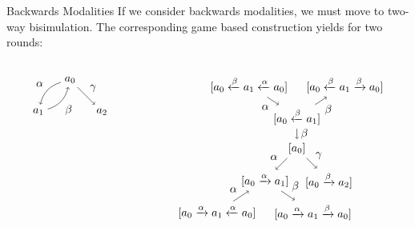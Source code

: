 \documentclass{beamer}
\begin{document}
\begin{frame}{Backwards Modalities}
    If we consider backwards modalities, we must move to two-way bisimulation. The corresponding game based construction yields for two rounds:
    \begin{columns}
    \begin{column}{0.3\textwidth}
    \begin{equation*}
    \begin{tikzpicture}
        \path node(a0) {$a_0$} +(-1,-1) node (a1) {$a_1$} +(1,-1) node(a2) {$a_2$};
        \path[->] 
        (a0) edge[bend right] node[midway, above left]{$\alpha$} (a1)
        (a1) edge[bend right] node[midway, below right]{$\beta$} (a0)
        (a0) edge node[midway, above right]{$\gamma$} (a2);
        \end{tikzpicture}
    \end{equation*}   
    \end{column}
    \begin{column}{0.7\textwidth}
    \begin{equation*}
    \begin{tikzpicture}
    \path 
    node (a) {$[a_0]$} +(-1,-1)
    node (b) {$[a_0 \xrightarrow {\alpha} a_1]$} +(1,-1)
    node (c) {$[a_0 \xrightarrow{\beta} a_2]$} +(0,1)
    node (d) {$[a_0 \xleftarrow{\beta} a_1]$} (b) + (-1.5,-1)
    node (e) {$[a_0 \xrightarrow{\alpha} a_1 \xleftarrow{\alpha} a_0]$} +(1.5,-1)
    node (f) {$[a_0 \xrightarrow{\alpha} a_1 \xrightarrow{\beta} a_0]$} (d) +(-1.5,1)
    node (g) {$[a_0 \xleftarrow{\beta} a_1 \xleftarrow{\alpha} a_0]$} +(1.5,1)
    node (h) {$[a_0 \xleftarrow{\beta} a_1 \xrightarrow{\beta} a_0]$};
    \path[->]
    (a) edge node[midway, above left]{$\alpha$} (b)
    (a) edge node[midway, above right]{$\gamma$} (c)
    (d) edge node[midway, right]{$\beta$} (a)
    (e) edge node[midway, above left]{$\alpha$} (b)
    (b) edge node[midway, above right]{$\beta$} (f)
    (g) edge node[midway, below left]{$\alpha$} (d)
    (d) edge node[midway, below right]{$\beta$} (h);
    \end{tikzpicture}  
    \end{equation*}
    \end{column}
    \end{columns}
\end{frame}
\end{document}
